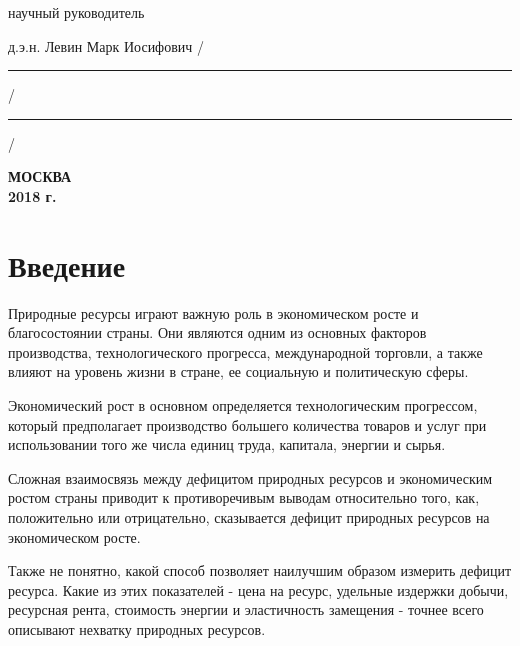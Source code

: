 \documentclass[12pt,a4paper, oneside]{extreport}
\begin{document}
\hfill{}

\noindent
научный руководитель 

\noindent
д.э.н. Левин Марк Иосифович 
\hfill /\rule{6em}{0.5pt}/\rule{6em}{0.5pt}/

\hfill{}

%
%

\vfill

\begin{center}
\normalsize \bfseries МОСКВА \\ 2018 г.
\end{center}
\endgroup




\tableofcontents  %



\chapter*{Введение}

Природные ресурсы играют важную роль в экономическом росте
и благосостоянии страны. Они являются одним из основных факторов производства, технологического прогресса, международной  торговли,
а также влияют на уровень жизни в стране, ее  социальную и политическую сферы.



Экономический рост в основном определяется технологическим прогрессом,
который предполагает  производство большего  количества товаров и услуг при использовании того же числа единиц   труда, капитала, энергии и сырья. 




Сложная взаимосвязь между дефицитом природных ресурсов и экономическим ростом  страны  приводит к противоречивым выводам относительно того,  как, положительно  или отрицательно,    сказывается   дефицит природных ресурсов на экономическом росте.



Также не понятно, какой  способ позволяет наилучшим  образом  измерить дефицит ресурса. Какие из этих показателей -  цена на ресурс, удельные издержки добычи,  ресурсная рента, стоимость  энергии и эластичность  замещения - точнее  всего описывают нехватку  природных ресурсов.
\end{document}

